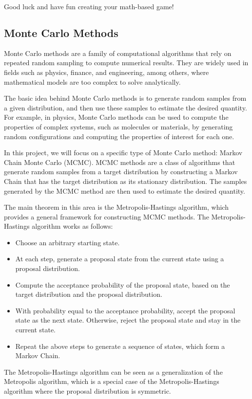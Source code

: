 \documentclass{article}
\begin{document}
\vspace{3mm}
Good luck and have fun creating your math-based game!


\pagebreak 


\subsection*{Monte Carlo Methods}
Monte Carlo methods are a family of computational algorithms that rely on repeated random sampling to compute numerical results. They are widely used in fields such as physics, finance, and engineering, among others, where mathematical models are too complex to solve analytically.


\vspace{3mm}
The basic idea behind Monte Carlo methods is to generate random samples from a given distribution, and then use these samples to estimate the desired quantity. For example, in physics, Monte Carlo methods can be used to compute the properties of complex systems, such as molecules or materials, by generating random configurations and computing the properties of interest for each one.

\vspace{3mm}
In this project, we will focus on a specific type of Monte Carlo method: Markov Chain Monte Carlo (MCMC). MCMC methods are a class of algorithms that generate random samples from a target distribution by constructing a Markov Chain that has the target distribution as its stationary distribution. The samples generated by the MCMC method are then used to estimate the desired quantity.

\vspace{3mm}
The main theorem in this area is the Metropolis-Hastings algorithm, which provides a general framework for constructing MCMC methods. The Metropolis-Hastings algorithm works as follows:
\begin{itemize}
    \item Choose an arbitrary starting state.
    \item At each step, generate a proposal state from the current state using a proposal distribution.
    \item Compute the acceptance probability of the proposal state, based on the target distribution and the proposal distribution.
    \item With probability equal to the acceptance probability, accept the proposal state as the next state. Otherwise, reject the proposal state and stay in the current state.
    \item Repeat the above steps to generate a sequence of states, which form a Markov Chain.
\end{itemize}
The Metropolis-Hastings algorithm can be seen as a generalization of the Metropolis algorithm, which is a special case of the Metropolis-Hastings algorithm where the proposal distribution is symmetric.
\end{document}
